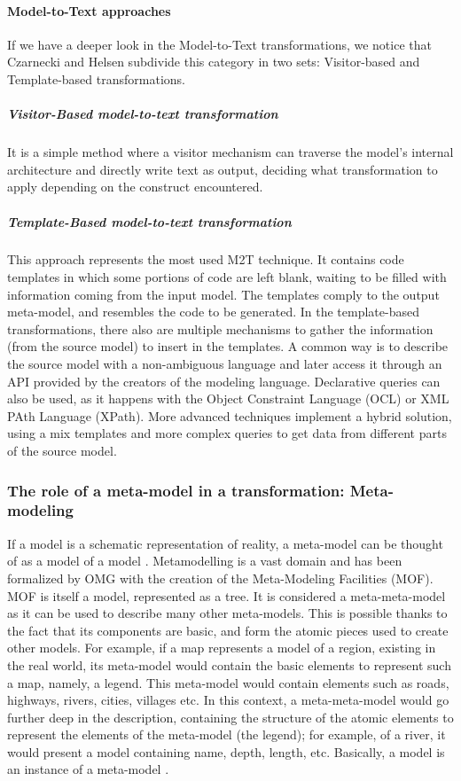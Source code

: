 \paragraph{Model-to-Text approaches}
If we have a deeper look in the Model-to-Text transformations, we notice that Czarnecki and Helsen \cite{Czarnecki03classificationof} subdivide this category in two sets: Visitor-based and Template-based transformations.
\subparagraph{Visitor-Based model-to-text transformation}
It is a simple method where a visitor mechanism can traverse the model's internal architecture and directly write text as output, deciding what transformation to apply depending on the construct encountered. 
\subparagraph{Template-Based model-to-text transformation}
This approach represents the most used M2T technique. It contains code templates in which some portions of code are left blank, waiting to be filled with information coming from the input model. 
The templates comply to the output meta-model, and resembles the code to be generated. 
In the template-based transformations, there also are multiple mechanisms to gather the information (from the source model) to insert in the templates. A common way is to describe the source model with a non-ambiguous language and later access it through an API provided by the creators of the modeling language. Declarative queries can also be used, as it happens with the Object Constraint Language (OCL) or XML PAth Language (XPath). 
More advanced techniques implement a hybrid solution, using a mix templates and more complex queries to get data from different parts of the source model.  

\subsubsection{The role of a meta-model in a transformation: Meta-modeling}
\label{Meta-modeling}
If a model is a schematic representation of reality, a meta-model can be thought of as a model of a model \cite{AcceleoUserGuide}.
Metamodelling is a vast domain and has been formalized by OMG with the creation of the Meta-Modeling Facilities (MOF).
MOF is itself a model, represented as a tree. It is considered a meta-meta-model as it can be used to describe many other meta-models. This is possible thanks to the fact that its components are basic, and form the atomic pieces used to create other models. 
For example, if a map represents a model of a region, existing in the real world, its meta-model would contain the basic elements to represent such a map, namely, a legend. This meta-model would contain elements such as roads, highways, rivers, cities, villages etc. In this context, a meta-meta-model would go further deep in the description, containing the structure of the atomic elements to represent the elements of the meta-model (the legend); for example, of a river, it would present a model containing name, depth, length, etc.  
Basically, a model is an instance of a meta-model \cite{UnderstandMetamodelling}. 


